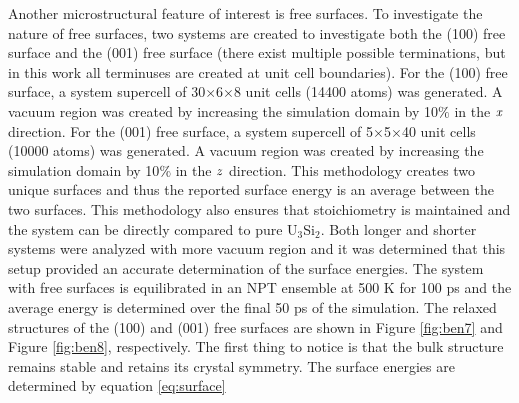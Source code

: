 \documentclass[review]{elsarticle}
\begin{document}

\FloatBarrier

Another microstructural feature of interest is free surfaces.  To investigate the nature of free surfaces, two systems are created to investigate both the (100) free surface and the (001) free surface (there exist multiple possible terminations, but in this work all terminuses are created at unit cell boundaries).  For the (100) free surface, a system supercell of 30$\times$6$\times$8 unit cells (14400 atoms) was generated.  A vacuum region was created by increasing the simulation domain by 10$\%$ in the $\it{x}$ direction.  For the (001) free surface, a system supercell of 5$\times$5$\times$40 unit cells (10000 atoms) was generated.  A vacuum region was created by increasing the simulation domain by 10$\%$ in the $\it{z}$ direction.  This methodology creates two unique surfaces and thus the reported surface energy is an average between the two surfaces.  This methodology also ensures that stoichiometry is maintained and the system can be directly compared to pure U$_{3}$Si$_{2}$.  Both longer and shorter systems were analyzed with more vacuum region and it was determined that this setup provided an accurate determination of the surface energies.  The system with free surfaces is equilibrated in an NPT ensemble at 500 K for 100 ps and the average energy is determined over the final 50 ps of the simulation.  The relaxed structures of the (100) and (001) free surfaces are shown in Figure \ref{fig:ben7} and Figure \ref{fig:ben8}, respectively.  The first thing to notice is that the bulk structure remains stable and retains its crystal symmetry.  The surface energies are determined by equation \ref{eq:surface}
\end{document}
